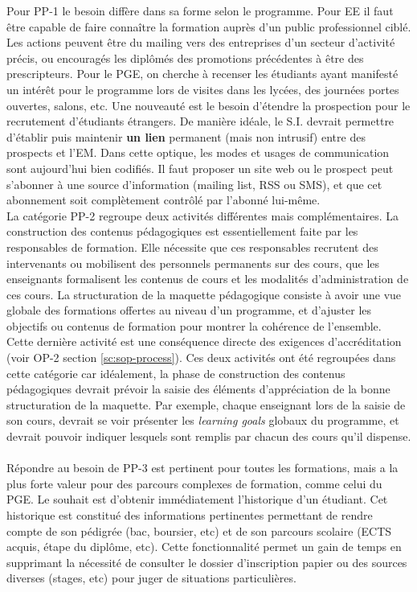 \documentclass{book}
\begin{document}
Pour PP-1 le besoin diffère dans sa forme selon le programme. Pour EE il faut 
être capable de faire connaître la formation auprès d'un public professionnel 
ciblé. Les actions peuvent être du mailing vers des entreprises d'un secteur 
d'activité précis, ou encouragés les diplômés des promotions précédentes à être 
des prescripteurs. Pour le PGE, on cherche à recenser les étudiants ayant manifesté 
un intérêt pour le programme lors de visites dans les lycées, des journées portes 
ouvertes, salons, etc. Une nouveauté est le besoin d'étendre la prospection pour 
le recrutement d'étudiants étrangers. 
De manière idéale, le S.I. devrait permettre d'établir puis maintenir \textbf{un 
lien} permanent (mais non intrusif) entre des prospects et l'EM. Dans cette optique, 
les modes et usages de communication sont aujourd'hui bien codifiés. Il faut proposer 
un site web ou le prospect peut s'abonner à une source d'information (mailing list,
RSS ou SMS), et que cet abonnement soit complètement contrôlé par l'abonné lui-même.
~\\


La catégorie PP-2 regroupe deux activités différentes mais complémentaires. La 
construction des contenus pédagogiques est essentiellement faite par les responsables de 
formation. Elle nécessite que ces responsables recrutent des intervenants ou mobilisent 
des personnels permanents sur des cours, que les enseignants formalisent les contenus de 
cours et les modalités d'administration de ces cours. La structuration de la maquette 
pédagogique consiste à avoir une vue globale des formations offertes au niveau d'un 
programme, et d'ajuster les objectifs ou contenus de formation pour montrer la cohérence 
de l'ensemble. Cette dernière activité est une conséquence directe des exigences 
d'accréditation (voir OP-2 section \ref{sc:sop-process}). Ces deux activités ont été
regroupées dans cette catégorie car idéalement, la phase de construction des contenus 
pédagogiques devrait prévoir la saisie des éléments d'appréciation de la bonne structuration
de la maquette. Par exemple, chaque enseignant lors de la saisie de son cours, devrait se
voir présenter les \emph{learning goals} globaux du programme, et devrait pouvoir 
indiquer lesquels sont remplis par chacun des cours qu'il dispense.
~\\

Répondre au besoin de PP-3 est pertinent pour toutes les formations, mais
a la plus forte valeur pour des parcours complexes de formation, comme celui du PGE.
Le souhait est d'obtenir immédiatement l'historique d'un étudiant. Cet historique
est constitué des informations pertinentes permettant de rendre compte de son pédigrée
(bac, boursier, etc)  et de son parcours scolaire (ECTS acquis, étape du diplôme, etc).
Cette fonctionnalité permet un gain de temps en supprimant la nécessité de consulter
le dossier d'inscription papier ou des sources diverses (stages, etc) pour juger
de situations particulières.
~\\
\end{document}
